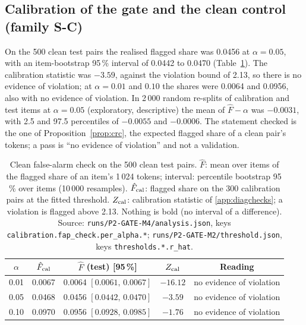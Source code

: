 \subsection{Calibration of the gate and the clean control (family S-C)}\label{ssec:res_cal}
On the 500 clean test pairs the realised flagged share was 0.0456 at $\alpha=0.05$, with an item-bootstrap 95\,\% interval of 0.0442 to
0.0470 (Table~\ref{tab:res_cal}).
The calibration statistic was $-3.59$, against the violation bound of 2.13, so there is no evidence of violation; at $\alpha=0.01$ and
$0.10$ the shares were 0.0064 and 0.0956, also with no evidence of violation.
In 2\,000 random re-splits of calibration and test items at $\alpha=0.05$ (exploratory, descriptive) the mean of $\hat F-\alpha$ was
$-0.0031$, with 2.5 and 97.5 percentiles of $-0.0055$ and $-0.0006$.
The statement checked is the one of Proposition~\ref{prop:crc}, the expected flagged share of a clean pair's tokens; a pass is ``no
evidence of violation'' and not a validation.

\begin{table}[!tbp]
\centering
\caption{Clean false-alarm check on the 500 clean test pairs. $\hat F$: mean over items of the flagged share of an item's 1\,024
tokens; interval: percentile bootstrap 95\,\% over items (10\,000 resamples). $\hat F_{\rm cal}$: flagged share on the 300 calibration
pairs at the fitted threshold. $Z_{\rm cal}$: calibration statistic of \ref{app:diagchecks}; a violation is flagged above 2.13. Nothing
is bold (no interval of a difference). Source: \nolinkurl{runs/P2-GATE-M4/analysis.json}, keys
\nolinkurl{calibration.fap_check.per_alpha.*}; \nolinkurl{runs/P2-GATE-M2/threshold.json}, keys \nolinkurl{thresholds.*.r_hat}.}
\label{tab:res_cal}
\footnotesize
\begin{tabular}{ccccc}
\toprule
$\alpha$ & $\hat F_{\rm cal}$ & $\hat F$ (test) [95\,\%] & $Z_{\rm cal}$ & Reading \\
\midrule
0.01 & 0.0067 & 0.0064 $[0.0061,\,0.0067]$ & $-16.12$ & no evidence of violation \\
0.05 & 0.0468 & 0.0456 $[0.0442,\,0.0470]$ & $-3.59$ & no evidence of violation \\
0.10 & 0.0970 & 0.0956 $[0.0928,\,0.0985]$ & $-1.76$ & no evidence of violation \\
\bottomrule
\end{tabular}
\end{table}

